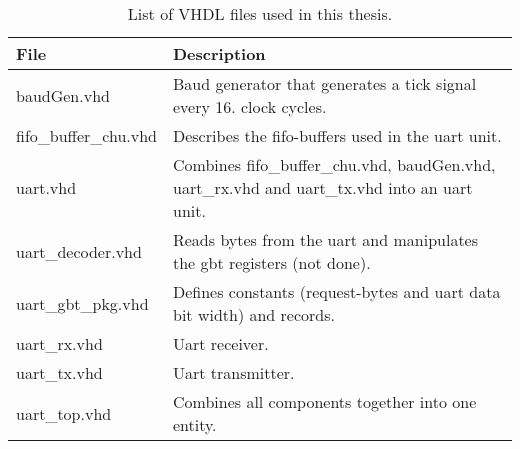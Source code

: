 \documentclass[main.tex]{subfiles}
\begin{document}
\begin{table}[H]
\centering
\caption{List of VHDL files used in this thesis.}
\label{tab:vhdcode}
\begin{tabular}{l p{8cm}}
\hline
 File & Description \\ \hline
 baudGen.vhd & Baud generator that generates a tick signal every 16. clock cycles. \\ %
 fifo\_buffer\_chu.vhd & Describes the fifo-buffers used in the uart unit. \\
 uart.vhd & Combines fifo\_buffer\_chu.vhd, baudGen.vhd, uart\_rx.vhd and uart\_tx.vhd into an uart unit. \\ %
 uart\_decoder.vhd & Reads bytes from the uart and manipulates the gbt registers (not done).\\ %
 uart\_gbt\_pkg.vhd & Defines constants (request-bytes and uart data bit width) and records. \\ %
 uart\_rx.vhd & Uart receiver. \\ %
 uart\_tx.vhd & Uart transmitter. \\ %
 uart\_top.vhd & Combines all components together into one entity. \\ \hline
\end{tabular}
\end{table}
\end{document}
